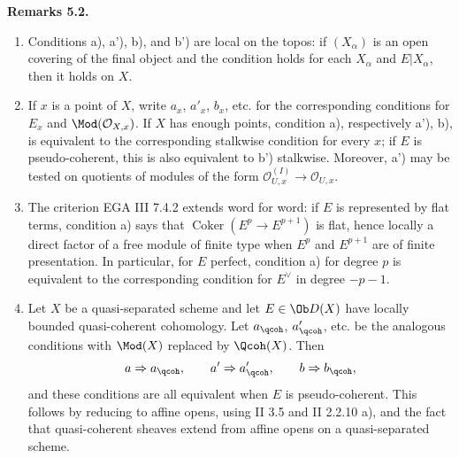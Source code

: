 \documentclass[11pt]{article}
\providecommand{\Coker}{\operatorname{Coker}}
\begin{document}
\textbf{Remarks 5.2.}
\begin{enumerate}[label=\roman*)]
\item Conditions a), a'), b), and b') are local on the topos: if \((X_\alpha)\) is an open covering of the final object and the condition holds for each \(X_\alpha\) and \(E|X_\alpha\), then it holds on \(X\).
\item If \(x\) is a point of \(X\), write \(a_x\), \(a'_x\), \(b_x\), etc. for the corresponding conditions for \(E_x\) and \(\Mod(\mathcal O_{X,x})\). If \(X\) has enough points, condition a), respectively a'), b), is equivalent to the corresponding stalkwise condition for every \(x\); if \(E\) is pseudo-coherent, this is also equivalent to b') stalkwise. Moreover, a') may be tested on quotients of modules of the form \(\mathcal O_{U,x}^{(I)}\to\mathcal O_{U,x}\).
\item The criterion EGA III 7.4.2 extends word for word: if \(E\) is represented by flat terms, condition a) says that \(\Coker(E^p\to E^{p+1})\) is flat, hence locally a direct factor of a free module of finite type when \(E^p\) and \(E^{p+1}\) are of finite presentation. In particular, for \(E\) perfect, condition a) for degree \(p\) is equivalent to the corresponding condition for \(E^{\vee}\) in degree \(-p-1\).
\item Let \(X\) be a quasi-separated scheme and let \(E\in\Ob D(X)\) have locally bounded quasi-coherent cohomology. Let \(a_{\qcoh}\), \(a'_{\qcoh}\), etc. be the analogous conditions with \(\Mod(X)\) replaced by \(\Qcoh(X)\). Then
\[
 a\Rightarrow a_{\qcoh},\qquad
 a'\Rightarrow a'_{\qcoh},\qquad
 b\Rightarrow b_{\qcoh},
\]
and these conditions are all equivalent when \(E\) is pseudo-coherent. This follows by reducing to affine opens, using II 3.5 and II 2.2.10 a), and the fact that quasi-coherent sheaves extend from affine opens on a quasi-separated scheme.
\end{enumerate}
\end{document}
